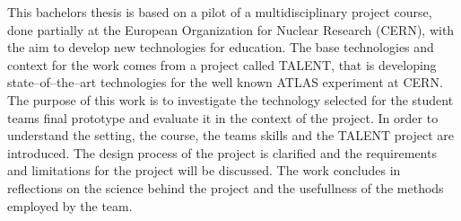 \documentclass[english,12pt,a4paper,dvips]{article}
\begin{document}


\makecoverpage

\begin{abstractpage}[english]

This bachelors thesis is based on a pilot of a multidisciplinary project course, done partially at the European Organization for Nuclear Research (CERN), with the aim to develop new technologies for education. The base technologies and context for the work comes from a project called TALENT, that is developing state--of--the--art technologies for the well known ATLAS experiment at CERN. The purpose of this work is to investigate the technology selected for the student teams final prototype and evaluate it in the context of the project. In order to understand the setting, the course, the teams skills and the TALENT project are introduced. The design process of the project is clarified and the requirements and limitations for the project will be discussed. The work concludes in reflections on the science behind the project and the usefullness of the methods employed by the team. 

\end{abstractpage}
\end{document}
